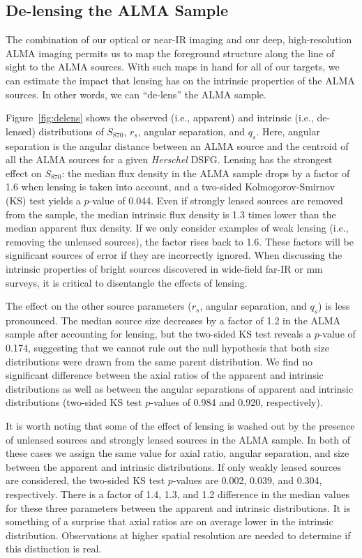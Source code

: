 \documentclass[iop]{emulateapj}
\begin{document}
\subsection{De-lensing the ALMA Sample}\label{sec:lensing}

The combination of our optical or near-IR imaging and our deep, high-resolution
ALMA imaging permits us to map the foreground structure along the line of sight
to the ALMA sources.  With such maps in hand for all of our targets, we can
estimate the impact that lensing has on the intrinsic properties of the ALMA
sources.  In other words, we can ``de-lens'' the ALMA sample.

Figure~\ref{fig:delens} shows the observed (i.e., apparent) and intrinsic
(i.e., de-lensed) distributions of $S_{870}$, $r_s$, angular separation, and
$q_s$.  Here, angular separation is the angular distance between an ALMA source
and the centroid of all the ALMA sources for a given {\it Herschel} DSFG.
Lensing has the strongest effect on $S_{870}$: the median flux density in the
ALMA sample drops by a factor of 1.6 when lensing is taken into account, and a
two-sided Kolmogorov-Smirnov (KS) test yields a $p$-value of 0.044.  Even
if strongly lensed sources are removed from the sample, the median intrinsic
flux density is 1.3 times lower than the median apparent flux density.  If we
only consider examples of weak lensing (i.e., removing the unlensed sources),
the factor rises back to 1.6.  These factors will be significant sources of
error if they are incorrectly ignored.  When discussing the intrinsic
properties of bright sources discovered in wide-field far-IR or mm surveys, it
is critical to disentangle the effects of lensing.

The effect on the other source parameters ($r_s$, angular separation, and
$q_s$) is less pronounced.  The median source size decreases by a factor of 1.2
in the ALMA sample after accounting for lensing, but the two-sided KS test
reveals a $p$-value of 0.174, suggesting that we cannot rule out the null
hypothesis that both size distributions were drawn from the same parent
distribution.  We find no significant difference between the axial ratios of
the apparent and intrinsic distributions as well as between the angular
separations of apparent and intrinsic distributions (two-sided KS test
$p$-values of 0.984 and 0.920, respectively). 

It is worth noting that some of the effect of lensing is washed out by the
presence of unlensed sources and strongly lensed sources in the ALMA sample.
In both of these cases we assign the same value for axial ratio, angular
separation, and size between the apparent and intrinsic distributions.  If only
weakly lensed sources are considered, the two-sided KS test $p$-values are
0.002, 0.039, and 0.304, respectively.  There is a factor of 1.4, 1.3, and 1.2
difference in the median values for these three parameters between the apparent
and intrinsic distributions.  It is something of a surprise that axial ratios
are on average lower in the intrinsic distribution.  Observations at higher
spatial resolution are needed to determine if this distinction is real.
\end{document}
